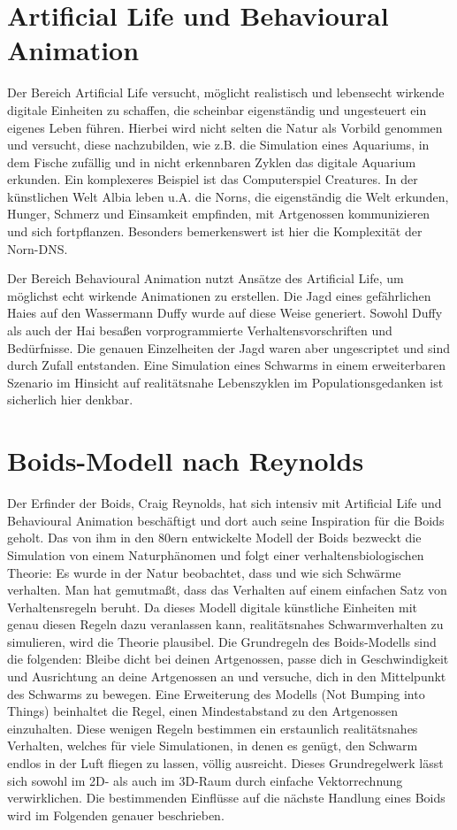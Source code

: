 \documentclass[draft=false
              ,paper=a4
              ,twoside=false
              ,fontsize=11pt
              ,headsepline
              ,BCOR10mm
              ,DIV11
              ,bibtotoc
              ,liststotoc
              ]{scrbook}
\begin{document}
\section{Artificial Life und Behavioural Animation}
Der Bereich Artificial Life versucht, möglicht realistisch und lebensecht wirkende digitale Einheiten zu schaffen, die scheinbar eigenständig und ungesteuert ein eigenes Leben führen. Hierbei wird nicht selten die Natur als Vorbild genommen und versucht, diese nachzubilden, wie z.B. die Simulation eines Aquariums, in dem Fische zufällig und in nicht erkennbaren Zyklen das digitale Aquarium erkunden. Ein komplexeres Beispiel ist das Computerspiel Creatures. In der künstlichen Welt Albia leben u.A. die Norns, die eigenständig die Welt erkunden, Hunger, Schmerz und Einsamkeit empfinden, mit Artgenossen kommunizieren und sich fortpflanzen. Besonders bemerkenswert ist hier die Komplexität der Norn-DNS.

Der Bereich Behavioural Animation nutzt Ansätze des Artificial Life, um möglichst echt wirkende Animationen zu erstellen. Die Jagd eines gefährlichen Haies auf den Wassermann Duffy wurde auf diese Weise generiert. Sowohl Duffy als auch der Hai besaßen vorprogrammierte Verhaltensvorschriften und Bedürfnisse. Die genauen Einzelheiten der Jagd waren aber ungescriptet und sind durch Zufall entstanden.
Eine Simulation eines Schwarms in einem erweiterbaren Szenario im Hinsicht auf realitätsnahe Lebenszyklen im Populationsgedanken ist sicherlich hier denkbar.
\section{Boids-Modell nach Reynolds}
Der Erfinder der Boids, Craig Reynolds, hat sich intensiv mit Artificial Life und Behavioural Animation beschäftigt und dort auch seine Inspiration für die Boids geholt.
Das von ihm in den 80ern entwickelte Modell der Boids bezweckt die Simulation von einem Naturphänomen und folgt einer verhaltensbiologischen Theorie: Es wurde in der Natur beobachtet, dass und wie sich Schwärme verhalten. Man hat gemutmaßt, dass das Verhalten auf einem einfachen Satz von Verhaltensregeln beruht. Da dieses Modell digitale künstliche Einheiten mit genau diesen Regeln dazu veranlassen kann, realitätsnahes Schwarmverhalten zu simulieren, wird die Theorie plausibel.
Die Grundregeln des Boids-Modells sind die folgenden: Bleibe dicht bei deinen Artgenossen, passe dich in Geschwindigkeit und Ausrichtung an deine Artgenossen an und versuche, dich in den Mittelpunkt des Schwarms zu bewegen.
Eine Erweiterung des Modells (Not Bumping into Things) beinhaltet die Regel, einen Mindestabstand zu den Artgenossen einzuhalten.
Diese wenigen Regeln bestimmen ein erstaunlich realitätsnahes Verhalten, welches für viele Simulationen, in denen es genügt, den Schwarm endlos in der Luft fliegen zu lassen, völlig ausreicht. Dieses Grundregelwerk lässt sich sowohl im 2D- als auch im 3D-Raum durch einfache Vektorrechnung verwirklichen. Die bestimmenden Einflüsse auf die nächste Handlung eines Boids wird im Folgenden genauer beschrieben.
\end{document}
